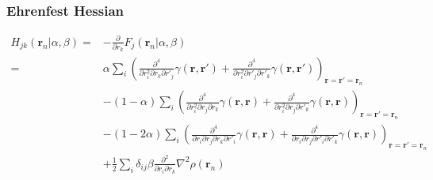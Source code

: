 \documentclass[letterpaper]{article}
\begin{document}
\subsubsection{Ehrenfest Hessian}
\begin{equation}
  \begin{split}
    H_{jk}(\mathbf{r}_n | \alpha, \beta)
    =&
    - \frac{\partial}{\partial r_k} F_j(\mathbf{r}_n | \alpha, \beta)\\
    =&
    \alpha
    \sum_i
    \left(
      \frac{\partial^4}{\partial r^2_i \partial r_k \partial r'_j} \gamma(\mathbf{r}, \mathbf{r}')
      +\frac{\partial^4}{\partial r^2_i \partial r'_j \partial r'_k} \gamma(\mathbf{r}, \mathbf{r}')
    \right)_{\mathbf{r} = \mathbf{r}' = \mathbf{r}_n}\\
    &- (1 - \alpha)
    \sum_i
    \left(
      \frac{\partial^4}{\partial r^2_i \partial r_j \partial r_k} \gamma(\mathbf{r}, \mathbf{r})
      + \frac{\partial^4}{\partial r^2_i \partial r_j \partial r'_k} \gamma(\mathbf{r}, \mathbf{r})
    \right)_{\mathbf{r} = \mathbf{r}' = \mathbf{r}_n}\\
    &- (1 - 2\alpha)
    \sum_i
    \left(
      \frac{\partial^4}{\partial r_i \partial r_j \partial r_k \partial r'_i} \gamma(\mathbf{r}, \mathbf{r})
      + \frac{\partial^4}{\partial r_i \partial r_j \partial r'_i \partial r'_k} \gamma(\mathbf{r}, \mathbf{r})
    \right)_{\mathbf{r} = \mathbf{r}' = \mathbf{r}_n}\\
    &+ \frac{1}{2} \sum_i \delta_{ij} \beta
    \frac{\partial^2}{\partial r_i \partial r_k} \nabla^2 \rho(\mathbf{r}_n)\\
  \end{split}
\end{equation}
\end{document}
